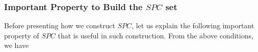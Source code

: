 \subsubsection{Important Property to Build the $SPC$ set}




Before presenting how we construct $SPC$, let us explain the
following important property of $SPC$ that is useful in such
construction. From the above conditions, we have


%


